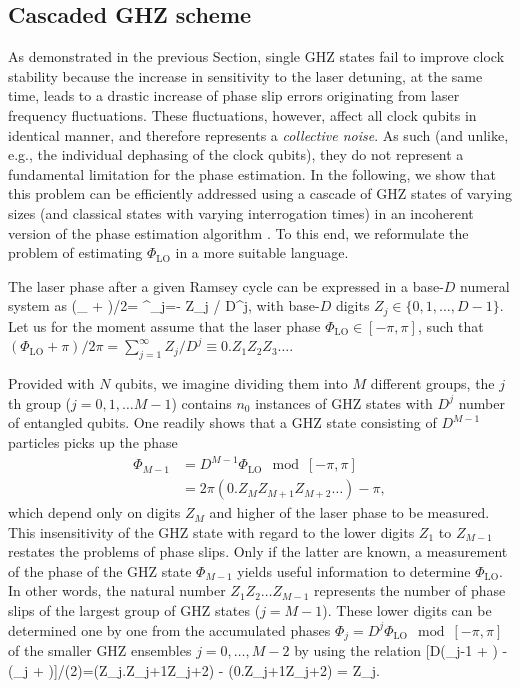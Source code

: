 \subsection{Cascaded GHZ scheme}
\label{sec:casGHZ}
As demonstrated in the previous Section, single GHZ states fail to improve clock
stability because the increase in sensitivity to the laser detuning, at the
same time, leads to a
drastic increase of phase slip errors originating from laser frequency fluctuations. 
These fluctuations, however, affect all clock qubits in identical manner, and
therefore represents a \textit{collective noise}. As such (and unlike, e.g., the individual dephasing of the clock qubits),
they do not represent a fundamental limitation for the
phase estimation.
In the following, we show that this
problem can be efficiently addressed using a cascade of GHZ states of varying
sizes (and classical states with varying interrogation times) in an incoherent version of the phase estimation algorithm
\cite{Nielsen_Chuang}. 
To this end, we
reformulate the problem of estimating $\Phi_\mathrm{LO}$ in a more suitable
language.

The laser phase after a given Ramsey cycle can be expressed in a base-$D$
numeral system as
\bel
	\label{eq:D-digits}
	(\Phi_ + \pi)/2\pi= \sum^\infty_{j=-\infty} Z_j / D^{j},
\eel
with base-$D$ digits $Z_j \in\{0,1, \hdots, D-1\}$.
Let us for the moment assume that the laser phase $\Phi_\mathrm{LO}\in
[-\pi,\pi]$, such that $(\Phi_\mathrm{LO} + \pi)/2\pi= \sum^\infty_{j=1} Z_j /
D^{j}\equiv 0.Z_1Z_2Z_3\hdots$.

Provided with $N$ qubits, we imagine dividing them into $M$
different groups, the $j$th group ($j=0,1,\dots M-1$) contains $n_0$
instances of GHZ states with $D^j$ number of entangled qubits.
One readily shows that a GHZ state consisting of $D^{M-1}$ particles picks up
the phase
\begin{align}
	\Phi_{M-1}&= D^{M-1} \Phi_\mathrm{LO} \mod [-\pi,\pi] \\
	 &= 2\pi (0.Z_{M}Z_{M+1}Z_{M+2}\hdots)-\pi,
\end{align}
which depend only on digits $Z_{M}$ and higher of the laser phase to be
measured.
This insensitivity of the GHZ state with regard to the lower digits $Z_1$ to
$Z_{M-1}$ restates the problems of phase slips. Only if the latter are known, a
measurement of the phase of the GHZ state $\Phi_{M-1}$ yields useful information
to determine $\Phi_\mathrm{LO}$. In other words, the natural number $Z_1Z_2\hdots
Z_{M-1}$ represents the number of phase slips of the largest group of GHZ states
($j=M-1$).
These lower digits can be determined one by one from the accumulated phases
$\Phi_j = D^{j} \Phi_\mathrm{LO} \mod [-\pi,\pi]$ of the smaller GHZ ensembles $j=0, \hdots, M-2$ by using the relation
\bel
	\label{eq:Z_j_measuring}
	 [D(\Phi_{j-1} + \pi) - (\Phi_j +
	\pi)]/(2\pi)=(Z_j.Z_{j+1}Z_{j+2}\hdots) - (0.Z_{j+1}Z_{j+2}\hdots) = Z_j.
\eel


